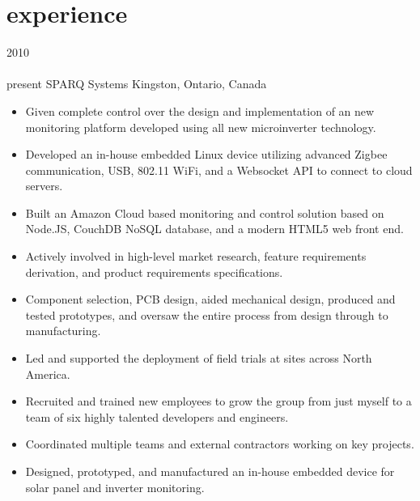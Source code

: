 
\section{experience}

\begin{entrylist}
\entry
  {2010\\\faChevronDown\\{\bodyfontit present}}
  {SPARQ Systems}
  {Kingston, Ontario, Canada}
  {
\begin{itemize}[leftmargin=12pt]
	\item Given complete control over the design and implementation of an new monitoring platform developed using all new microinverter technology.
  \item Developed an in-house {\bodyfontit embedded Linux} device utilizing advanced {\bodyfontit Zigbee} communication, USB, 802.11 {\bodyfontit WiFi}, and a {\bodyfontit Websocket} API to connect to cloud servers.
  \item Built an Amazon {\bodyfontit Cloud} based monitoring and control solution based on {\bodyfontit Node.JS}, CouchDB {\bodyfontit NoSQL} database, and a modern {\bodyfontit HTML5} web front end.
	\item Actively involved in high-level market research, feature requirements derivation, and product requirements specifications.
	\item Component selection, {\bodyfontit PCB} design, aided mechanical design, produced and tested {\bodyfontit prototypes}, and oversaw the entire process from {\bodyfontit design} through to {\bodyfontit manufacturing}.
  \item Led and supported the deployment of field trials at sites across North America.
	\item Recruited and trained new employees to grow the group from just myself to a team of six highly talented developers and engineers.
	\item Coordinated multiple teams and external contractors working on key projects.
\end{itemize}
\begin{itemize}[leftmargin=12pt]
	\item Designed, prototyped, and manufactured an in-house embedded device for solar panel and inverter monitoring.

\end{itemize}}
\end{entrylist}
